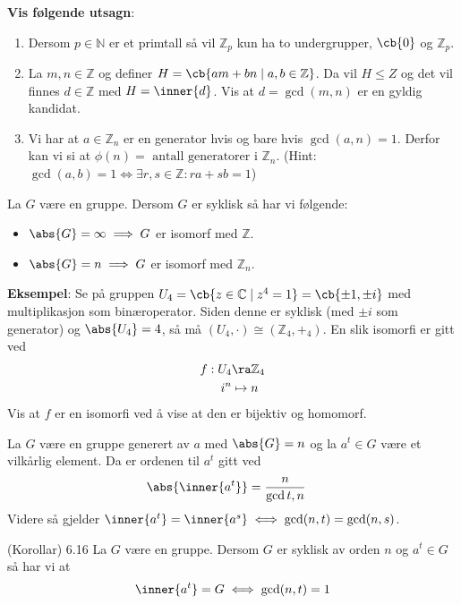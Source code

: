 \textbf{Vis følgende utsagn}:
\begin{enumerate}
	\item Dersom $p\in \mathbb{N}$ er et primtall så vil $\mathbb{Z}_p$ kun ha to
	      undergrupper, $\cb{0}$ og $\mathbb{Z}_p$.
	\item La $m, n \in \mathbb{Z}$ og definer $H = \cb{am + bn\mid a, b \in \mathbb{Z}}$.
	      Da vil $H \leq Z$ og det vil finnes $d \in \mathbb{Z}$ med $H = \inner{d}$. Vis
	      at $d = \gcd(m, n)$ er en gyldig kandidat.
	\item Vi har at $a\in \mathbb{Z}_n$ er en generator hvis og bare hvis $\gcd(a,n)=1$.
	      Derfor kan vi si at $\phi(n) = \text{ antall generatorer i }\mathbb{Z}_n$.
	      (Hint: $\gcd(a, b) = 1 \iff \exists r, s \in \mathbb{Z} : ra + sb = 1$)
\end{enumerate}

\begin{theorem*}{6.10}{}
	La $G$ være en gruppe. Dersom $G$ er syklisk så har vi følgende:
	\begin{itemize}
		\item $\abs{G} = \infty \implies G$ er isomorf med $\mathbb{Z}$.
		\item $\abs{G} = n \implies G$ er isomorf med $\mathbb{Z}_n$.
	\end{itemize}
\end{theorem*}

\textbf{Eksempel}:
Se på gruppen $U_4 = \cb{z\in\mathbb{C}\mid z^4=1} = \cb{\pm 1, \pm i}$ med
multiplikasjon som binæroperator. Siden denne er syklisk (med $\pm i$ som generator)
og $\abs{U_4} = 4$, så må $(U_4, \cdot) \cong (\mathbb{Z}_4, +_4)$. En slik isomorfi
er gitt ved
\begin{align}
	f: U_4 & \ra \mathbb{Z}_4 \\
	i^n    & \mapsto n
\end{align}
Vis at $f$ er en isomorfi ved å vise at den er bijektiv og homomorf.

\begin{theorem*}{6.14}{}
	La $G$ være en gruppe generert av $a$ med $\abs{G} = n$ og la $a^t \in G$ være et
	vilkårlig element. Da er ordenen til $a^t$ gitt ved
	\begin{align}
		\abs{\inner{a^t}} & = \frac{n}{\gcd{t, n}}
	\end{align}
	Videre så gjelder $\inner{a^t} = \inner{a^s} \iff \gcd(n, t) = \gcd(n, s)$.
\end{theorem*}

\begin{theorem*}{(Korollar) 6.16}{}
  La $G$ være en gruppe. Dersom $G$ er syklisk av orden $n$ og $a^t \in G$ så har vi
  at 
  \begin{align}
    \inner{a^t} = G \iff \gcd(n, t) = 1
  \end{align}
\end{theorem*}
